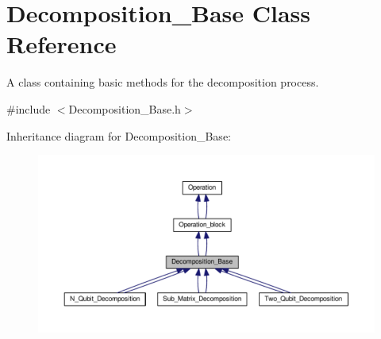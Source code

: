 \hypertarget{class_decomposition___base}{}\section{Decomposition\+\_\+\+Base Class Reference}
\label{class_decomposition___base}


A class containing basic methods for the decomposition process.  




{\ttfamily \#include $<$Decomposition\+\_\+\+Base.\+h$>$}



Inheritance diagram for Decomposition\+\_\+\+Base\+:
\nopagebreak
\begin{figure}[H]
\begin{center}
\leavevmode
\includegraphics[width=350pt]{class_decomposition___base__inherit__graph}
\end{center}
\end{figure}
